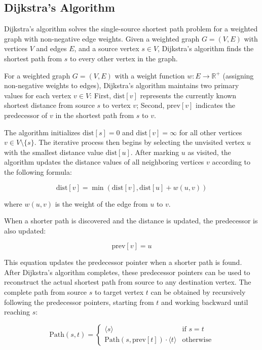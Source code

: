 \subsection{Dijkstra's Algorithm}
\label{subsec:DijkstrasAlgorithm}

Dijkstra's algorithm solves the single-source shortest path problem for a weighted graph with non-negative edge weights. Given a weighted graph $G = (V, E)$ with vertices $V$ and edges $E$, and a source vertex $s \in V$, Dijkstra's algorithm finds the shortest path from $s$ to every other vertex in the graph.

For a weighted graph $G = (V, E)$ with a weight function $w: E \rightarrow \mathbb{R}^+$ (assigning non-negative weights to edges), Dijkstra's algorithm maintains two primary values for each vertex $v \in V$: First, $\text{dist}[v]$ represents the currently known shortest distance from source $s$ to vertex $v$; Second, $\text{prev}[v]$ indicates the predecessor of $v$ in the shortest path from $s$ to $v$.

The algorithm initializes $\text{dist}[s] = 0$ and $\text{dist}[v] = \infty$ for all other vertices $v \in V \setminus \{s\}$. The iterative process then begins by selecting the unvisited vertex $u$ with the smallest distance value $\text{dist}[u]$. After marking $u$ as visited, the algorithm updates the distance values of all neighboring vertices $v$ according to the following formula:

\begin{equation}
\text{dist}[v] = \min(\text{dist}[v], \text{dist}[u] + w(u, v))
\end{equation}

where $w(u, v)$ is the weight of the edge from $u$ to $v$.

When a shorter path is discovered and the distance is updated, the predecessor is also updated:

\begin{equation}
\text{prev}[v] = u
\end{equation}

This equation updates the predecessor pointer when a shorter path is found. After Dijkstra's algorithm completes, these predecessor pointers can be used to reconstruct the actual shortest path from source to any destination vertex. The complete path from source $s$ to target vertex $t$ can be obtained by recursively following the predecessor pointers, starting from $t$ and working backward until reaching $s$:

\begin{equation}
\text{Path}(s, t) = 
\begin{cases}
\langle s \rangle & \text{if } s = t \\
\text{Path}(s, \text{prev}[t]) \cdot \langle t \rangle & \text{otherwise}
\end{cases}
\end{equation}


